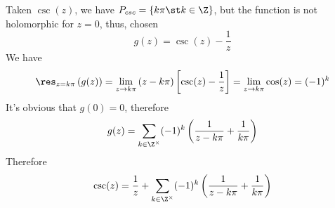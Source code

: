 \documentclass[../mmf.tex]{subfiles}
\begin{document}
\begin{eg}
	Taken $\csc(z)$, we have $P_{csc}=\left\{ k\pi\st k\in\Z \right\}$, but the function is not holomorphic for $z=0$, thus, chosen
	\begin{equation*}
		g(z)=\csc(z)-\frac{1}{z}
	\end{equation*}
	We have
	\begin{equation*}
		\res_{z=k\pi}\left( g(z) \right)=\lim_{z\to k\pi}\left( z-k\pi \right)\left[ \csc(z)-\frac{1}{z} \right]=\lim_{z\to k\pi}\cos(z)=(-1)^{k}
	\end{equation*}
	It's obvious that $g(0)=0$, therefore
	\begin{equation*}
		g(z)=\sum_{k\in\Z^{\times}}(-1)^k\left( \frac{1}{z-k\pi}+\frac{1}{k\pi} \right)
	\end{equation*}
	Therefore
	\begin{equation*}
		\csc(z)=\frac{1}{z}+\sum_{k\in\Z^{\times}}(-1)^k\left( \frac{1}{z-k\pi}+\frac{1}{k\pi} \right)
	\end{equation*}
\end{eg}
\end{document}
